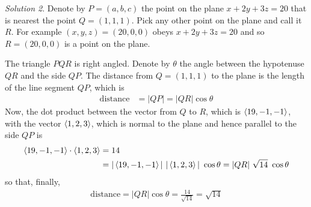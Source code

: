 \begin{eg}
\medskip
\noindent\textit{Solution 2}. 
Denote by $P=(a,b,c)$ the point on the plane $x+2y+3z=20$ that
is nearest the point $Q=(1,1,1)$. Pick any other point on the plane
and call it $R$. For example
$(x,y,z) = (20,0,0)$ obeys $x+2y+3z=20$  and so $R=(20,0,0)$ is a point 
on the plane. 

The triangle $PQR$ is right angled. Denote by $\theta$
the angle between the hypotenuse $QR$ and the side $QP$.
The distance from $Q=(1,1,1)$ to the plane is the length of the 
line segment $QP$, which is
\begin{align*}
\text{distance} &= |QP| = |QR|\cos\theta
\end{align*} 
Now, the dot product between the vector from $Q$ to $R$, which is 
$\left< 19,-1,-1\right>$, with the vector $\left< 1,2,3\right>$, which is 
normal to the plane and hence parallel to the side $QP$ is
\begin{align*}
 \left< 19,-1,-1\right>\cdot \left< 1,2,3\right> &=14 \\
   &= |\left< 19,-1,-1\right>|\  |\left< 1,2,3\right>|\ \cos\theta
   = |QR|\  \sqrt{14}\ \cos\theta
\end{align*}
so that, finally,
\begin{align*}
\text{distance} = |QR|\cos\theta =\frac{14}{\sqrt{14}}=\sqrt{14}
\end{align*}

\end{eg}

